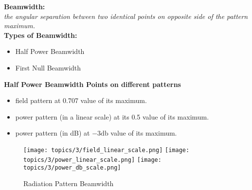\documentclass[class=article, crop=false]{standalone}
\begin{document}
    \textbf{Beamwidth:}\\
    \emph{
        the angular separation between two identical points on opposite side of the pattern maximum.
    }\\

    \textbf{Types of Beamwidth:}
    \begin{itemize}
        \item Half Power Beamwidth
        \item First Null Beamwidth
    \end{itemize}

    \textbf{Half Power Beamwidth Points on different patterns}
    \begin{itemize}
        \item field pattern at 0.707 value of its maximum.
        \item power pattern (in a linear scale) at its 0.5 value of its maximum.
        \item power pattern (in dB) at $- 3 \si{\decibel}$ value of its maximum.
    \end{itemize}
    \begin{figure}[h!]
        \texttt{[image: topics/3/field\_linear\_scale.png]}\hfill
        \texttt{[image: topics/3/power\_linear\_scale.png]}\hfill
        \texttt{[image: topics/3/power\_db\_scale.png]}
        \caption{Radiation Pattern Beamwidth \cite{BALANIS}}
        \label{fig:beamwidth}
    \end{figure}
\end{document}
